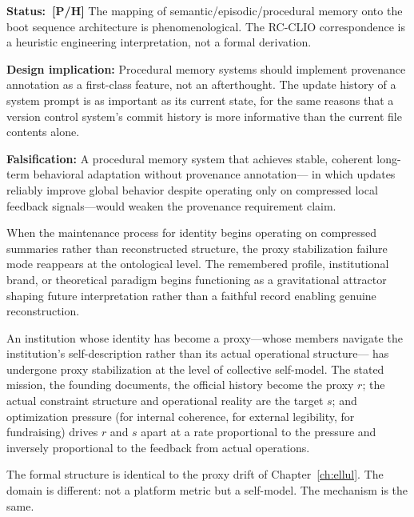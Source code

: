 \begin{constraintboundary}
\textbf{Status:~\textbf{[P/H]}} The mapping of semantic/episodic/procedural
memory onto the boot sequence architecture is phenomenological. The RC-CLIO
correspondence is a heuristic engineering interpretation, not a formal
derivation.

\textbf{Design implication:} Procedural memory systems should implement
provenance annotation as a first-class feature, not an afterthought. The
update history of a system prompt is as important as its current state,
for the same reasons that a version control system's commit history is
more informative than the current file contents alone.

\textbf{Falsification:} A procedural memory system that achieves stable,
coherent long-term behavioral adaptation without provenance annotation---
in which updates reliably improve global behavior despite operating only
on compressed local feedback signals---would weaken the provenance
requirement claim.
\end{constraintboundary}

When the maintenance process for identity begins operating on compressed summaries
rather than reconstructed structure, the proxy stabilization failure mode
reappears at the ontological level. The remembered profile, institutional brand,
or theoretical paradigm begins functioning as a gravitational attractor shaping
future interpretation rather than a faithful record enabling genuine reconstruction.

\claimP An institution whose identity has become a proxy---whose members navigate
the institution's self-description rather than its actual operational structure---
has undergone proxy stabilization at the level of collective self-model. The
stated mission, the founding documents, the official history become the proxy
$r$; the actual constraint structure and operational reality are the target $s$;
and optimization pressure (for internal coherence, for external legibility, for
fundraising) drives $r$ and $s$ apart at a rate proportional to the pressure and
inversely proportional to the feedback from actual operations.

The formal structure is identical to the proxy drift of Chapter~\ref{ch:ellul}.
The domain is different: not a platform metric but a self-model. The mechanism
is the same.

